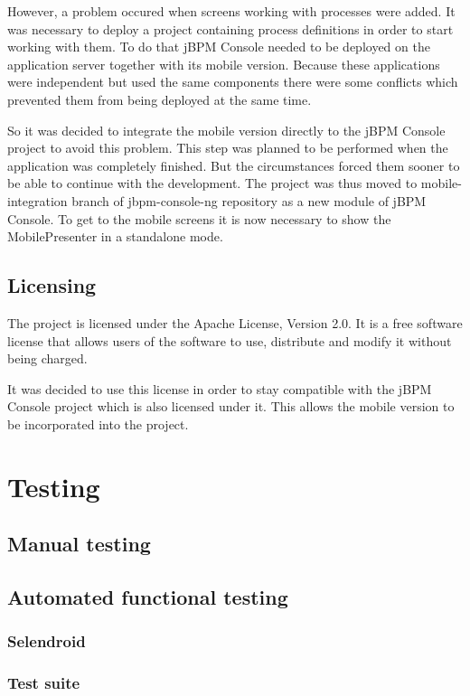 \documentclass[12pt,oneside,final]{fithesis2}
\begin{document}
However, a problem occured when screens working with processes were added.
It was necessary to deploy a project containing process definitions in order to start working with them.
To do that jBPM Console needed to be deployed on the application server together with its mobile version.
Because these applications were independent but used the same components there were some conflicts which prevented them from being deployed at the same time.

So it was decided to integrate the mobile version directly to the jBPM Console project to avoid this problem.
This step was planned to be performed when the application was completely finished.
But the circumstances forced them sooner to be able to continue with the development.
The project was thus moved to mobile-integration branch of jbpm-console-ng repository\footnotemark{} as a new module of jBPM Console.
To get to the mobile screens it is now necessary to show the MobilePresenter in a standalone mode.

\section{Licensing}
The project is licensed under the Apache License, Version 2.0\footnotemark{}.
It is a free software license that allows users of the software to use, distribute and modify it without being charged.

It was decided to use this license in order to stay compatible with the jBPM Console project which is also licensed under it.
This allows the mobile version to be incorporated into the project.

\chapter{Testing}
\section{Manual testing}
\section{Automated functional testing}
\subsection{Selendroid}
\subsection{Test suite}
\end{document}
